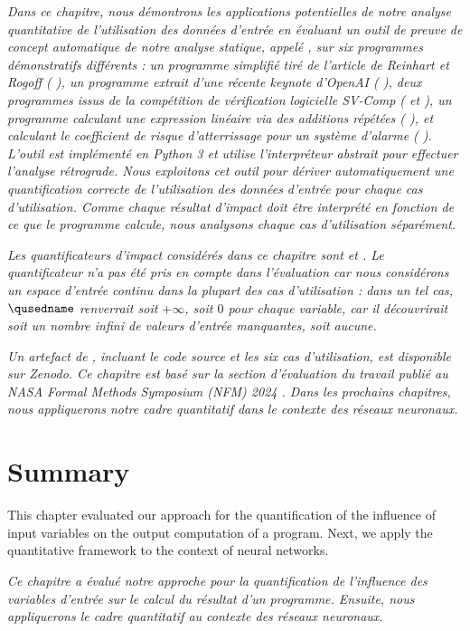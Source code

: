 \emph{Dans ce chapitre, nous démontrons les applications potentielles de notre analyse quantitative de l'utilisation des données d'entrée en évaluant un outil de preuve de concept automatique de notre analyse statique, appelé \impatto\sidenotemark[\ref{impatto}], sur six programmes démonstratifs différents : un programme simplifié tiré de l'article de Reinhart et Rogoff (\cf{} ), un programme extrait d'une récente keynote d'OpenAI (\cf{} ), deux programmes issus de la compétition de vérification logicielle SV-Comp (\cf{}  et ), un programme calculant une expression linéaire via des additions répétées (\cf{} ), et  calculant le coefficient de risque d'atterrissage pour un système d'alarme (\cf{} ). L'outil \impatto{} est implémenté en Python 3 et utilise l'interpréteur abstrait \interproc\sidenotemark[\ref{interproc}] pour effectuer l'analyse rétrograde. Nous exploitons cet outil pour dériver automatiquement une quantification correcte de l'utilisation des données d'entrée pour chaque cas d'utilisation. Comme chaque résultat d'impact doit être interprété en fonction de ce que le programme calcule, nous analysons chaque cas d'utilisation séparément.
}

\emph{
Les quantificateurs d'impact considérés dans ce chapitre sont \outcomesname{} et \rangename{}. Le quantificateur \qusedname{} n'a pas été pris en compte dans l'évaluation car nous considérons un espace d'entrée continu dans la plupart des cas d'utilisation : dans un tel cas, $\qusedname$ renverrait soit $+\infty$, soit $0$ pour chaque variable, car il découvrirait soit un nombre infini de valeurs d'entrée manquantes, soit aucune.
}

\emph{
Un artefact de \impatto, incluant le code source et les six cas d'utilisation, est disponible sur Zenodo\sidenote{\impattozenodo}. Ce chapitre est basé sur la section d'évaluation du travail publié au NASA Formal Methods Symposium (NFM) 2024 . Dans les prochains chapitres, nous appliquerons notre cadre quantitatif dans le contexte des réseaux neuronaux.
}






\section{Summary}

This chapter evaluated our approach for the quantification of the influence of input variables on the output computation of a program. Next, we apply the quantitative framework to the context of neural networks.

\emph{Ce chapitre a évalué notre approche pour la quantification de l'influence des variables d'entrée sur le calcul du résultat d'un programme. Ensuite, nous appliquerons le cadre quantitatif au contexte des réseaux neuronaux.}
